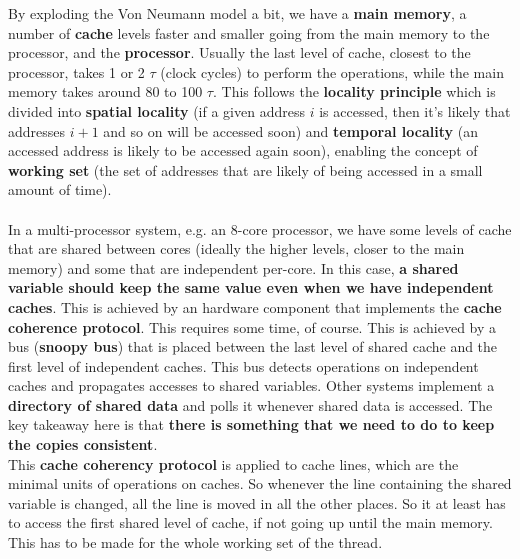 \documentclass[10pt]{report}
\begin{document}
By exploding the Von Neumann model a bit, we have a \textbf{main memory}, a number of \textbf{cache} levels faster and smaller going from the main memory to the processor, and the \textbf{processor}. Usually the last level of cache, closest to the processor, takes 1 or 2 $\tau$ (clock cycles) to perform the operations, while the main memory takes around 80 to 100 $\tau$. This follows the \textbf{locality principle} which is divided into \textbf{spatial locality} (if a given address $i$ is accessed, then it's likely that addresses $i+1$ and so on will be accessed soon)  and \textbf{temporal locality} (an accessed address is likely to be accessed again soon), enabling the concept of \textbf{working set} (the set of addresses that are likely of being accessed in a small amount of time).\\\\
In a multi-processor system, e.g. an 8-core processor, we have some levels of cache that are shared between cores (ideally the higher levels, closer to the main memory) and some that are independent per-core. In this case, \textbf{a shared variable should keep the same value even when we have independent caches}. This is achieved by an hardware component that implements the \textbf{cache coherence protocol}. This requires some time, of course. This is achieved by a bus (\textbf{snoopy bus}) that is placed between the last level of shared cache and the first level of independent caches. This bus detects operations on independent caches and propagates accesses to shared variables. Other systems implement a \textbf{directory of shared data} and polls it whenever shared data is accessed. The key takeaway here is that \textbf{there is something that we need to do to keep the copies consistent}.\\
This \textbf{cache coherency protocol} is applied to cache lines, which are the minimal units of operations on caches. So whenever the line containing the shared variable is changed, all the line is moved in all the other places. So it at least has to access the first shared level of cache, if not going up until the main memory. This has to be made for the whole working set of the thread.
\end{document}
